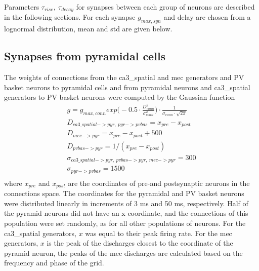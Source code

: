 \documentclass[a4paper,12pt]{article}
\begin{document}

Parameters $\tau_{rise},\ \tau_{decay}$ for synapses between each group of neurons are described in the following sections. For each synapse $g_{max, syn}$ and delay are chosen from a lognormal distribution, mean and std are given below.  

\subsection{Synapses from pyramidal cells}










% 


The weights of connections from the ca3\_spatial and mec generators and PV basket neurons to pyramidal cells and from pyramidal neurons and ca3\_spatial generators to PV basket neurons were computed by the Gaussian function
\begin{equation}
\begin{aligned}
\label{eq:gaussian}
g = g_{max, conn} exp \Big( -0.5 \cdot \frac{D_{conn}^2}{\sigma_{conn}^2} \Big) \cdot \frac{1}{\sigma_{conn} \cdot \sqrt{2 \pi}} \\
D_{ca3\_spatial->pyr,\ pyr->pvbas} = x_{pre} - x_{post} \\
D_{mec->pyr} = x_{pre} - x_{post} + 500 \\
D_{pvbas->pyr} = 1 / (x_{pre} - x_{post})  \\
\sigma_{ca3\_spatial->pyr,\ pvbas->pyr,\ mec->pyr} = 300 \\
\sigma_{pyr->pvbas} = 1500 \\
\end{aligned}
\end{equation}
where $x_{pre}$ and $x_{post}$ are the coordinates of pre-and postsynaptic neurons in the connections space. The coordinates for the pyramidal and PV basket neurons were distributed linearly in increments of 3 ms and 50 ms, respectively. Half of the pyramid neurons did not have an x coordinate, and the connections of this population were set randomly, as for all other populations of neurons. For the ca3\_spatial generators, $x$ was equal to their peak firing rate.  For the mec generators,  $x$ is the peak of the discharges closest to the coordinate of the pyramid neuron, the peaks of the mec discharges are calculated based on the frequency and phase of the grid.
\end{document}
